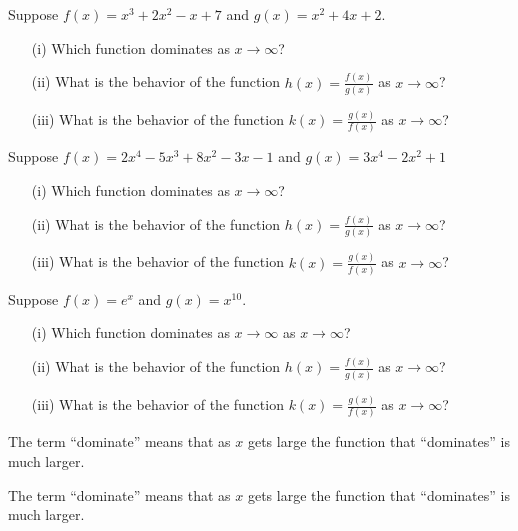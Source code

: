 \begin{activity}\label{A:0.6.4}
\ba
		\item Suppose $f(x) = x^{3} + 2x^{2}-x + 7$ and $g(x) = x^{2} + 4x + 2$.  
			\begin{enumerate}
                \item[(i)] Which function dominates as $x \to \infty$?
				\item[(ii)] What is the behavior of the function $h(x) = \displaystyle{\frac {f(x)}{g(x)}}$ as $x \to \infty$?
				\item[(iii)] What is the behavior of the function $k(x) = \displaystyle{\frac {g(x)}{f(x)}}$ as $x \to \infty$?
			\end{enumerate}
		\item Suppose $f(x) = 2x^{4} - 5x^{3} + 8x^{2} - 3x - 1$ and $g(x) = 3x^{4} - 2x^{2} + 1$
			\begin{enumerate}
                \item[(i)] Which function dominates as $x \to \infty$?
				\item[(ii)] What is the behavior of the function $h(x) = \displaystyle{\frac {f(x)}{g(x)}}$ as $x \to \infty$?
				\item[(iii)] What is the behavior of the function $k(x) = \displaystyle{\frac {g(x)}{f(x)}}$ as $x \to \infty$?
			\end{enumerate}
        \item Suppose $f(x) = e^{x}$ and $g(x) = x^{10}$.
			\begin{enumerate}
                \item[(i)] Which function dominates as $x \to \infty$ as $x \to \infty$?
				\item[(ii)] What is the behavior of the function $h(x) = \displaystyle{\frac {f(x)}{g(x)}}$ as $x \to \infty$?
				\item[(iii)] What is the behavior of the function $k(x) = \displaystyle{\frac {g(x)}{f(x)}}$ as $x \to \infty$?
			\end{enumerate}
\ea

\end{activity}
\begin{smallhint}
    The term ``dominate'' means that as $x$ gets large the function that ``dominates'' is
    much larger.
\end{smallhint}
\begin{bighint}
    The term ``dominate'' means that as $x$ gets large the function that ``dominates'' is
    much larger.
\end{bighint}
